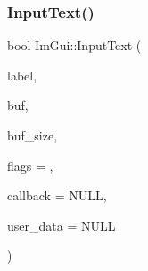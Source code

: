 \subsubsection{\texorpdfstring{Input\+Text()}{InputText()}\hspace{0.1cm}{\footnotesize\ttfamily [2/2]}}
{\footnotesize\ttfamily bool Im\+Gui\+::\+Input\+Text (\begin{DoxyParamCaption}\item[{const char $\ast$}]{label,  }\item[{char $\ast$}]{buf,  }\item[{size\+\_\+t}]{buf\+\_\+size,  }\item[{\mbox{\hyperlink{imgui_8h_a7d2c6153a6b9b5d3178ce82434ac9fb8}{Im\+Gui\+Input\+Text\+Flags}}}]{flags = {},  }\item[{\mbox{\hyperlink{imgui_8h_a65fd2b568a62c9aa2a28a8a13eb65ad7}{Im\+Gui\+Input\+Text\+Callback}}}]{callback = {\ttfamily NULL},  }\item[{void $\ast$}]{user\+\_\+data = {\ttfamily NULL} }\end{DoxyParamCaption})}


